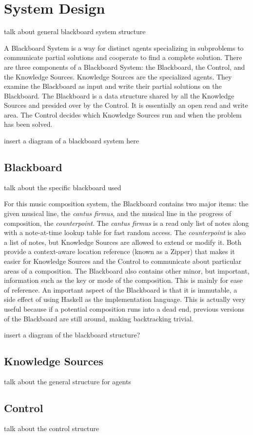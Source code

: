 \section{System Design}

talk about general blackboard system structure

A Blackboard System is a way for distinct agents specializing in subproblems to communicate partial solutions and cooperate to find a complete solution.
There are three components of a Blackboard System: the Blackboard, the Control, and the Knowledge Sources.
Knowledge Sources are the specialized agents. They examine the Blackboard as input and write their partial solutions on the Blackboard.
The Blackboard is a data structure shared by all the Knowledge Sources and presided over by the Control. It is essentially an open read and write area.
The Control decides which Knowledge Sources run and when the problem has been solved.

insert a diagram of a blackboard system here

\subsection{Blackboard}

talk about the specific blackboard used

For this music composition system, the Blackboard contains two major items: the given musical line, the \emph{cantus firmus}, and the musical line in the progress of composition, the \emph{counterpoint}.
The \emph{cantus firmus} is a read only list of notes along with a note-at-time lookup table for fast random access.
The \emph{counterpoint} is also a list of notes, but Knowledge Sources are allowed to extend or modify it.
Both provide a context-aware location reference (known as a Zipper) that makes it easier for Knowledge Sources and the Control to communicate about particular areas of a composition.
The Blackboard also contains other minor, but important, information such as the key or mode of the composition. This is mainly for ease of reference.
An important aspect of the Blackboard is that it is immutable, a side effect of using Haskell as the implementation language.
This is actually very useful because if a potential composition runs into a dead end, previous versions of the Blackboard are still around, making backtracking trivial.

insert a diagram of the blackboard structure?

\subsection{Knowledge Sources}

talk about the general structure for agents



\subsection{Control}

talk about the control structure
